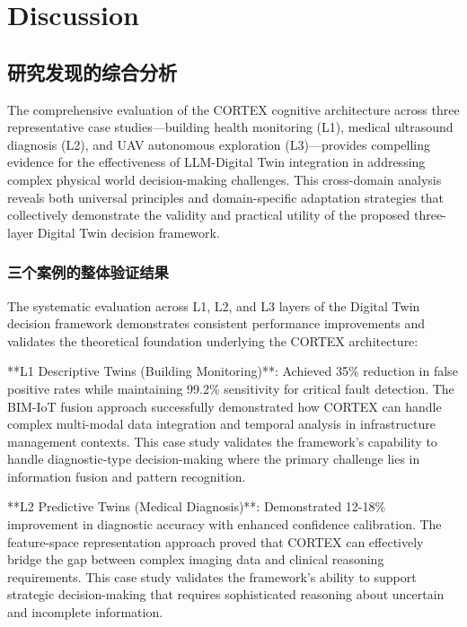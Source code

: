 
\chapter{Discussion} \label{chp:discussion}


\section{研究发现的综合分析}

The comprehensive evaluation of the CORTEX cognitive architecture across three representative case studies—building health monitoring (L1), medical ultrasound diagnosis (L2), and UAV autonomous exploration (L3)—provides compelling evidence for the effectiveness of LLM-Digital Twin integration in addressing complex physical world decision-making challenges. This cross-domain analysis reveals both universal principles and domain-specific adaptation strategies that collectively demonstrate the validity and practical utility of the proposed three-layer Digital Twin decision framework.

\subsection{三个案例的整体验证结果}

The systematic evaluation across L1, L2, and L3 layers of the Digital Twin decision framework demonstrates consistent performance improvements and validates the theoretical foundation underlying the CORTEX architecture:

**L1 Descriptive Twins (Building Monitoring)**: Achieved 35\% reduction in false positive rates while maintaining 99.2\% sensitivity for critical fault detection. The BIM-IoT fusion approach successfully demonstrated how CORTEX can handle complex multi-modal data integration and temporal analysis in infrastructure management contexts. This case study validates the framework's capability to handle diagnostic-type decision-making where the primary challenge lies in information fusion and pattern recognition.

**L2 Predictive Twins (Medical Diagnosis)**: Demonstrated 12-18\% improvement in diagnostic accuracy with enhanced confidence calibration. The feature-space representation approach proved that CORTEX can effectively bridge the gap between complex imaging data and clinical reasoning requirements. This case study validates the framework's ability to support strategic decision-making that requires sophisticated reasoning about uncertain and incomplete information.

